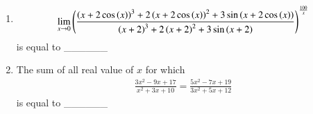 \documentclass[journal]{IEEEtran}
\begin{document}
\begin{enumerate}
\item 
\begin{align*}
    \lim\limits_{x \rightarrow 0}\left(\frac{\left(x+2\cos\left(x\right)\right)^3 + 2\left(x+2\cos\left(x\right)\right)^2 + 3\sin\left(x+2\cos\left(x\right)\right)}{\left(x+2\right)^3 + 2\left(x+2\right)^2 + 3\sin\left(x+2\right)}\right)^\frac{100}{x}
\end{align*}
is equal to \_\_\_\_\_\_ \\
\item The sum of all real value of $x$ for which
\begin{align*}
    \frac{3x^2-9x+17}{x^2+3x+10} = \frac{5x^2-7x+19}{3x^2+5x+12}
\end{align*}
is equal to \_\_\_\_\_\_ \\
			 \end{enumerate}
			 
\end{document}
